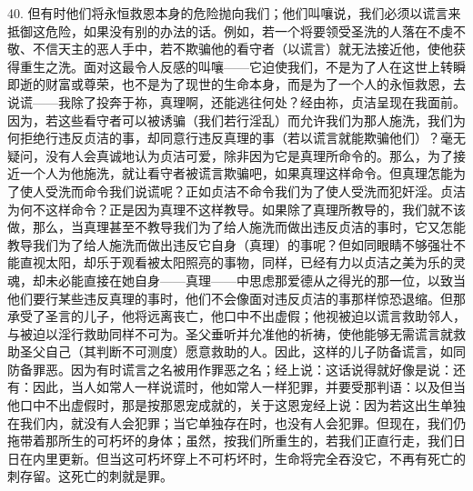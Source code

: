 40. 但有时他们将永恒救恩本身的危险抛向我们；他们叫嚷说，我们必须以谎言来抵御这危险，如果没有别的办法的话。例如，若一个将要领受圣洗的人落在不虔不敬、不信天主的恶人手中，若不欺骗他的看守者（以谎言）就无法接近他，使他获得重生之洗。面对这最令人反感的叫嚷——它迫使我们，不是为了人在这世上转瞬即逝的财富或尊荣，也不是为了现世的生命本身，而是为了一个人的永恒救恩，去说谎——我除了投奔于祢，真理啊，还能逃往何处？经由祢，贞洁呈现在我面前。因为，若这些看守者可以被诱骗（我们若行淫乱）而允许我们为那人施洗，我们为何拒绝行违反贞洁的事，却同意行违反真理的事（若以谎言就能欺骗他们）？毫无疑问，没有人会真诚地认为贞洁可爱，除非因为它是真理所命令的。那么，为了接近一个人为他施洗，就让看守者被谎言欺骗吧，如果真理这样命令。但真理怎能为了使人受洗而命令我们说谎呢？正如贞洁不命令我们为了使人受洗而犯奸淫。贞洁为何不这样命令？正是因为真理不这样教导。如果除了真理所教导的，我们就不该做，那么，当真理甚至不教导我们为了给人施洗而做出违反贞洁的事时，它又怎能教导我们为了给人施洗而做出违反它自身（真理）的事呢？但如同眼睛不够强壮不能直视太阳，却乐于观看被太阳照亮的事物，同样，已经有力以贞洁之美为乐的灵魂，却未必能直接在她自身——真理——中思虑那爱德从之得光的那一位，以致当他们要行某些违反真理的事时，他们不会像面对违反贞洁的事那样惊恐退缩。但那承受了圣言的儿子，他将远离丧亡，他口中不出虚假；他视被迫以谎言救助邻人，与被迫以淫行救助同样不可为。圣父垂听并允准他的祈祷，使他能够无需谎言就救助圣父自己（其判断不可测度）愿意救助的人。因此，这样的儿子防备谎言，如同防备罪恶。因为有时谎言之名被用作罪恶之名；经上说：这话说得就好像是说：还有：因此，当人如常人一样说谎时，他如常人一样犯罪，并要受那判语：以及但当他口中不出虚假时，那是按那恩宠成就的，关于这恩宠经上说：因为若这出生单独在我们内，就没有人会犯罪；当它单独存在时，也没有人会犯罪。但现在，我们仍拖带着那所生的可朽坏的身体；虽然，按我们所重生的，若我们正直行走，我们日日在内里更新。但当这可朽坏穿上不可朽坏时，生命将完全吞没它，不再有死亡的刺存留。这死亡的刺就是罪。\par

